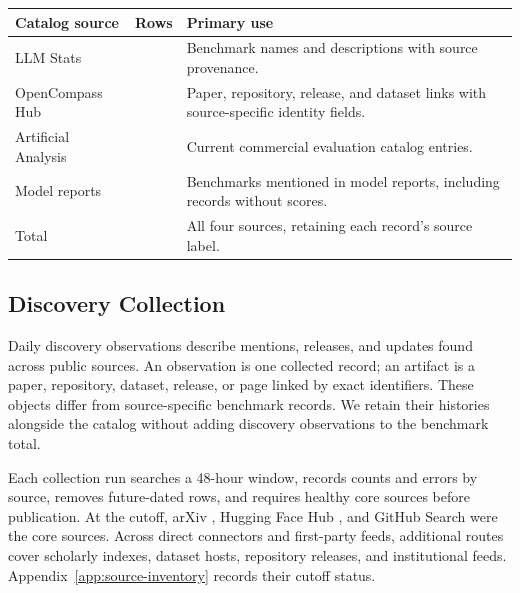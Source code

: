 \documentclass[11pt]{article}
\newcommand{\ReportNumber}[1]{\pgfmathprintnumber[fixed,precision=0,1000 sep={,},assume math mode=true]{#1}}
\begin{document}
\begin{center}
\centering\small
\begin{tabularx}{\textwidth}{L{0.23\textwidth}r Y}
\toprule
\textbf{Catalog source} & \textbf{Rows} & \textbf{Primary use}\\
\midrule
LLM Stats & \ReportLLMStatsCount{} & Benchmark names and descriptions with source provenance.\\
OpenCompass Hub & \ReportOpenCompassCount{} & Paper, repository, release, and dataset links with source-specific identity fields.\\
Artificial Analysis & \ReportArtificialAnalysisCount{} & Current commercial evaluation catalog entries.\\
Model reports & \ReportModelReportCount{} & Benchmarks mentioned in model reports, including records without scores.\\
\midrule
Total & \ReportNumber{\ReportCatalogCount} & All four sources, retaining each record's source label.\\
\bottomrule
\end{tabularx}
\label{tab:catalog-sources}
\end{center}

\subsection{Discovery Collection}

Daily discovery observations describe mentions, releases, and updates found across public sources. An observation is one collected record; an artifact is a paper, repository, dataset, release, or page linked by exact identifiers. These objects differ from source-specific benchmark records. We retain their histories alongside the catalog without adding discovery observations to the benchmark total.

Each collection run searches a 48-hour window, records counts and errors by source, removes future-dated rows, and requires healthy core sources before publication. At the cutoff, arXiv \citep{arxivapi}, Hugging Face Hub \citep{huggingfacehub}, and GitHub Search \citep{githubsearchdocs} were the core sources. Across \ReportConnectorCount{} direct connectors and \ReportFirstPartyFeedCount{} first-party feeds, additional routes cover scholarly indexes, dataset hosts, repository releases, and institutional feeds. Appendix~\ref{app:source-inventory} records their cutoff status.
\end{document}
